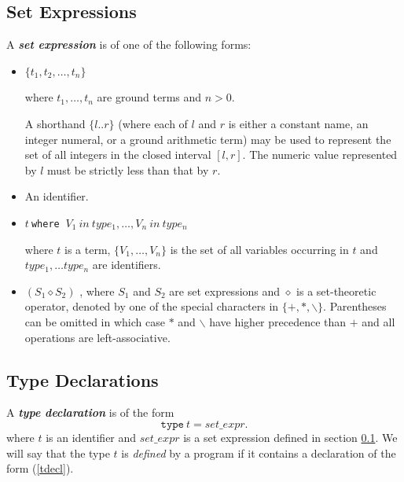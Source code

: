 \documentclass[a4paper,10pt]{article}
\begin{document}
\subsection{Set Expressions}\label{sexpr}

A \textbf{\textit{set expression}}  is of one of the following forms:
\begin{itemize}
\item $\{t_1,t_2, \ldots, t_n\}$

 where $t_1,\ldots,t_n$ are ground terms and $n>0$. 

A shorthand $\{l..r\}$ (where each of $l$ and $r$ is either a constant name, an integer numeral, or a ground arithmetic term) may be used to represent the  set of all integers in the closed interval $[l, r]$. The numeric value represented by $l$ must be strictly less than that by $r$.


\item An identifier.
\item $t~$\texttt{where} $~V_1~in~type_1,\ldots, V_n~in~type_n$
 
where $t$ is a term, $\{V_1, \ldots, V_n\}$ is the set of all variables occurring in $t$ and $type_1, \ldots type_n$ are identifiers. 

\item $(S_1 \diamond S_2)$ , where $S_1$ and $S_2$ are set expressions and $\diamond$ is a set-theoretic operator, denoted by one of the special characters in $\{+, *, \backslash \}$. Parentheses can be omitted in which case $*$ and $\backslash$ have higher precedence than $+$ and all operations are left-associative.
\end{itemize}

\subsection{Type Declarations}
A \textit{\textbf{type declaration}} is of the form 
\begin{equation}\label{tdecl}
\texttt{type}~t = set\_expr.
\end{equation}
where $t$ is an identifier and $set\_expr$ is a set expression defined in section \ref{sexpr}.
We will say that the type $t$ is \textit{defined} by a program if it contains a declaration of the form (\ref{tdecl}). 
\end{document}

